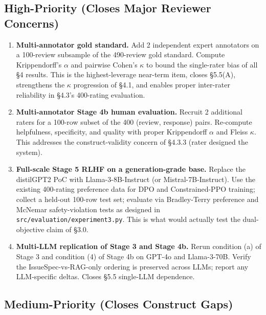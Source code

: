 \documentclass[sigconf, nonacm, anonymous, balance=false]{acmart}
\begin{document}
\subsection{High-Priority (Closes Major Reviewer Concerns)}\label{high-priority-closes-major-reviewer-concerns}

\begin{enumerate}
\def\labelenumi{\arabic{enumi}.}
\item
  \textbf{Multi-annotator gold standard.} Add 2 independent expert annotators on a 100-review subsample of the 490-review gold standard. Compute Krippendorff's $\alpha$ and pairwise Cohen's $\kappa$ to bound the single-rater bias of all \S4 results. This is the highest-leverage near-term item, closes \S5.5(A), strengthens the $\kappa$ progression of \S4.1, and enables proper inter-rater reliability in \S4.3's 400-rating evaluation.
\item
  \textbf{Multi-annotator Stage 4b human evaluation.} Recruit 2 additional raters for a 100-row subset of the 400 (review, response) pairs. Re-compute helpfulness, specificity, and quality with proper Krippendorff $\alpha$ and Fleiss $\kappa$. This addresses the construct-validity concern of \S4.3.3 (rater designed the system).
\item
  \textbf{Full-scale Stage 5 RLHF on a generation-grade base.} Replace the distilGPT2 PoC with Llama-3-8B-Instruct (or Mistral-7B-Instruct). Use the existing 400-rating preference data for DPO and Constrained-PPO training; collect a held-out 100-row test set; evaluate via Bradley-Terry preference and McNemar safety-violation tests as designed in \texttt{src/evaluation/experiment3.py}. This is what would actually test the dual-objective claim of \S3.0.
\item
  \textbf{Multi-LLM replication of Stage 3 and Stage 4b.} Rerun condition (a) of Stage 3 and condition (4) of Stage 4b on GPT-4o and Llama-3-70B. Verify the IssueSpec-vs-RAG-only ordering is preserved across LLMs; report any LLM-specific deltas. Closes \S5.5 single-LLM dependence.
\end{enumerate}

\subsection{Medium-Priority (Closes Construct Gaps)}\label{medium-priority-closes-construct-gaps}
\end{document}
